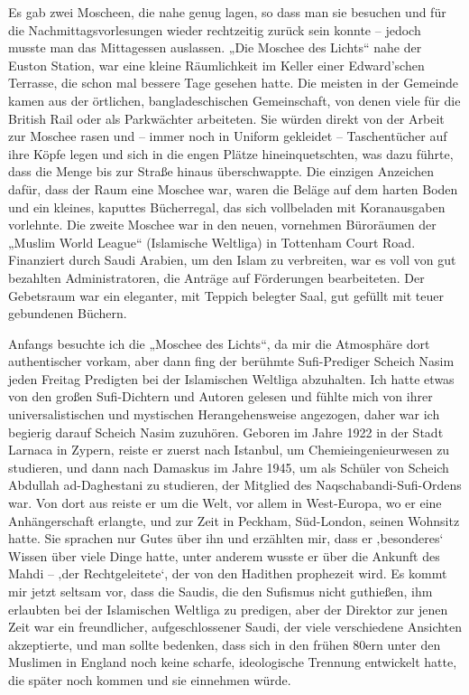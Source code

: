 \documentclass[12pt]{memoir}
\def\–{-\hskip0pt}
\begin{document}
Es gab zwei Moscheen, die nahe genug lagen, so dass man sie besuchen
und für die Nachmittagsvorlesungen wieder rechtzeitig zurück sein konnte
– jedoch musste man das Mittagessen auslassen.
„Die Moschee des Lichts“ nahe der Euston Station,
war eine kleine Räumlichkeit im Keller einer Edward’schen Terrasse,
die schon mal bessere Tage gesehen hatte.
Die meisten in der Gemeinde kamen aus der örtlichen,
bangladeschischen Gemeinschaft,
von denen viele für die British Rail oder als Parkwächter arbeiteten.
Sie würden direkt von der Arbeit zur Moschee rasen und –
immer noch in Uniform gekleidet – Taschentücher auf ihre Köpfe legen
und sich in die engen Plätze hineinquetschten, was dazu führte,
dass die Menge bis zur Straße hinaus überschwappte.
Die einzigen Anzeichen dafür, dass der Raum eine Moschee war,
waren die Beläge auf dem harten Boden und ein kleines, kaputtes Bücherregal,
das sich vollbeladen mit Koranausgaben vorlehnte.
Die zweite Moschee war in den neuen,
vornehmen Büroräumen der „Muslim World League“ (Islamische Weltliga)
in Tottenham Court Road.
Finanziert durch Saudi Arabien, um den Islam zu verbreiten,
war es voll von gut bezahlten Administratoren,
die Anträge auf Förderungen bearbeiteten.
Der Gebetsraum war ein eleganter, mit Teppich belegter Saal,
gut gefüllt mit teuer gebundenen Büchern.

Anfangs besuchte ich die „Moschee des Lichts“,
da mir die Atmosphäre dort authentischer vorkam,
aber dann fing der berühmte Sufi-Prediger Scheich Nasim
jeden Freitag Predigten bei der Islamischen Weltliga abzuhalten.
Ich hatte etwas von den großen Sufi-Dichtern und Autoren gelesen
und fühlte mich von ihrer universalistischen
und mystischen Herangehensweise angezogen,
daher war ich begierig darauf Scheich Nasim zuzuhören.
Geboren im Jahre 1922 in der Stadt Larnaca in Zypern,
reiste er zuerst nach Istanbul, um Chemieingenieurwesen zu studieren,
und dann nach Damaskus im Jahre 1945,
um als Schüler von Scheich Abdullah ad\–Daghestani zu studieren,
der Mitglied des Naqschabandi-Sufi-Ordens war.
Von dort aus reiste er um die Welt, vor allem in West-Europa,
wo er eine Anhängerschaft erlangte, und zur Zeit in Peckham, Süd-London,
seinen Wohnsitz hatte.
Sie sprachen nur Gutes über ihn und erzählten mir,
dass er ‚besonderes‘ Wissen über viele Dinge hatte,
unter anderem wusste er über die Ankunft des Mahdi –
‚der Rechtgeleitete‘, der von den Hadithen prophezeit wird.
Es kommt mir jetzt seltsam vor, dass die Saudis,
die den Sufismus nicht guthießen,
ihm erlaubten bei der Islamischen Weltliga zu predigen,
aber der Direktor zur jenen Zeit war ein freundlicher,
aufgeschlossener Saudi, der viele verschiedene Ansichten akzeptierte,
und man sollte bedenken, dass sich in den frühen 80ern
unter den Muslimen in England noch keine scharfe,
ideologische Trennung entwickelt hatte,
die später noch kommen und sie einnehmen würde.
\end{document}
